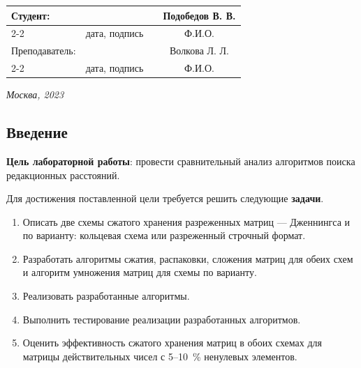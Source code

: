 \documentclass[12pt, a4paper]{article}
\begin{document}
\begin{titlepage}
  \fontsize{14}{21}\selectfont
  \vspace{5cm}


  \noindent\begin{tabularx}{\textwidth}{ X >{\centering}p{4cm} p{1cm} c }
   Студент: & & & Подобедов В. В. \\ \cline{2-2} \cline{4-4}
   & \fontsize{10}{15}\selectfont дата, подпись & & \fontsize{10}{15}\selectfont Ф.И.О. \\
   Преподаватель: & & & Волкова Л. Л.\\ \cline{2-2} \cline{4-4}
   & \fontsize{10}{15}\selectfont дата, подпись & & \fontsize{10}{15}\selectfont Ф.И.О.
  \end{tabularx}

  \vspace{\fill}

  \begin{center}
   \it{Москва}, 2023
  \end{center}

  \thispagestyle{empty}
\end{titlepage}


\renewcommand{\contentsname}{Содержание}
\setcounter{page}{2}
\tableofcontents


\newpage
\begin{center}
   \section*{Введение} 
\end{center}

\justifying
\textbf{Цель лабораторной работы}: провести сравнительный анализ алгоритмов поиска редакционных расстояний.

Для достижения поставленной цели требуется решить следующие \textbf{задачи}.
\begin{enumerate}
\item Описать две схемы сжатого хранения разреженных матриц --- Дженнингса и по варианту: кольцевая схема или разреженный строчный формат.
\item Разработать алгоритмы сжатия, распаковки, сложения матриц для обеих схем и алгоритм умножения матриц для схемы по варианту.
\item Реализовать разработанные алгоритмы.
\item Выполнить тестирование реализации разработанных алгоритмов.
\item Оценить эффективность сжатого хранения матриц в обоих схемах для матрицы действительных чисел с 5--10~\% ненулевых элементов.
\end{enumerate}
\end{document}

